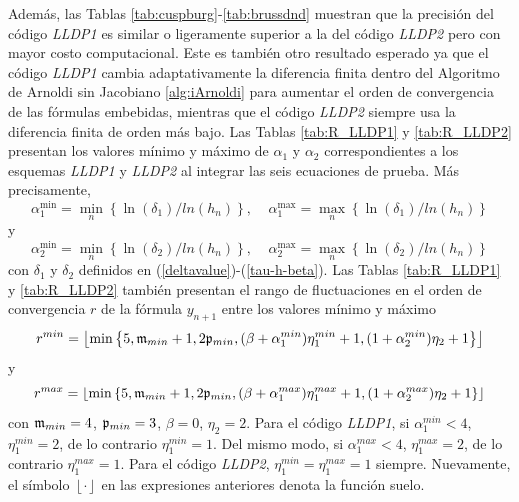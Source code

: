 Además, las Tablas \ref{tab:cuspburg}-\ref{tab:brussdnd} muestran que la precisión del código \emph{LLDP1} es similar o ligeramente superior a la del código \emph{LLDP2} pero con mayor costo computacional. Este es también otro resultado esperado ya que el código \emph{LLDP1} cambia adaptativamente la diferencia finita dentro del Algoritmo de Arnoldi sin Jacobiano \ref{alg:iArnoldi} para aumentar el orden de convergencia de las fórmulas embebidas, mientras que el código \emph{ LLDP2} siempre usa la diferencia finita de orden más bajo. Las Tablas \ref{tab:R_LLDP1} y \ref{tab:R_LLDP2} presentan los valores mínimo y máximo de $\alpha _{1}$ y $\alpha _{2}$ correspondientes a los esquemas \emph{LLDP1} y \emph{LLDP2} al integrar las seis ecuaciones de prueba. Más precisamente,
\[\alpha _{1}^{\min }=\underset{n}{\min }\left\{ \ln (\delta
_{1})/ln(h_{n})\right\}, \;\;\;\; \alpha _{1}^{\max }=\underset{n}{\max }\left\{
\ln (\delta _{1})/ln(h_{n})\right\}\]
y
\[\alpha _{2}^{\min }=\underset{n}{\min }\left\{ \ln (\delta _{2})/ln(h_{n})\right\}, \;\;\;\; \alpha _{2}^{\max }=\underset{n}{\max }\left\{ \ln (\delta _{2})/ln(h_{n})\right\} \]
con $\delta_{1}$ y $\delta_{2}$ definidos en (\ref{deltavalue})-(\ref{tau-h-beta}). Las Tablas \ref{tab:R_LLDP1} y \ref{tab:R_LLDP2} también presentan el rango de fluctuaciones en el orden de convergencia $r$ de la fórmula $y_{n+1}$ entre los valores mínimo y máximo
\[r^{min}=\left\lfloor\mathrm{min}\left\{5,\mathfrak{m}_{min}+1,2\mathfrak{p}_{min},(\beta+\alpha^{min}_1)\eta^{min}_1+1,(1+\alpha^{min}_2)\eta_2+1 \right\} \right\rfloor\]
y
\[r^{max}=\left\lfloor\mathrm{min}\left\{5,\mathfrak{m}_{min}+1,2\mathfrak{p}_{min},(\beta+\alpha^{max}_1)\eta^{max}_1+1,(1+\alpha^{max}_2)\eta_2+1 \right\} \right\rfloor\]
con $\mathfrak{m}_{min}=4$, $\mathfrak{p}_{min}=3$, $\beta=0$, $\eta_2=2$. Para el código \emph{LLDP1}, si $\alpha^{min}_1 < 4$, $\eta^{min}_1=2$, de lo contrario $\eta^{min}_1=1$. Del mismo modo, si $\alpha^{max}_1 < 4$, $\eta^{max}_1=2$, de lo contrario $\eta^{max}_1=1$. Para el código \emph{LLDP2}, $\eta^{min}_1=\eta^{max}_1=1$ siempre. Nuevamente, el símbolo $\left\lfloor \cdot \right\rfloor$ en las expresiones anteriores denota la función suelo.

